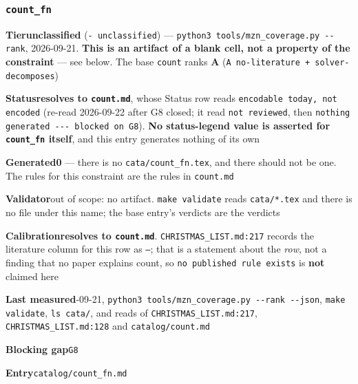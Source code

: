 \documentclass[10pt,a4paper]{article}
\newcommand{\entryfield}[2]{{\raggedright\textbf{#1}\quad #2\par}}
\begin{document}
\subsubsection*{\texttt{count\_\allowbreak{}fn}}
\label{entry:count-fn}
\entryfield{Tier}{\textbf{unclassified} (\texttt{- unclassified}) --- \texttt{python3 tools/\allowbreak{}mzn\_\allowbreak{}coverage.\allowbreak{}py -\allowbreak{}-\allowbreak{}rank}, 2026-09-21. \textbf{This is an artifact of a blank cell, not a property of the constraint} --- see below. The base \texttt{count} ranks \textbf{A} (\texttt{A no-\allowbreak{}literature + solver-\allowbreak{}decomposes})}
\entryfield{Status}{\textbf{resolves to \texttt{count.md}}, whose Status row reads \texttt{encodable today, not encoded} (re-read 2026-09-22 after G8 closed; it read \texttt{not reviewed}, then \texttt{nothing generated -\allowbreak{}-\allowbreak{}-\allowbreak{} blocked on G8}). \textbf{No status-legend value is asserted for \texttt{count\_fn} itself}, and this entry generates nothing of its own}
\entryfield{Generated}{\textbf{0} --- there is no \texttt{cata/count\_fn.tex}, and there should not be one. The rules for this constraint are the rules in \texttt{count.md}}
\entryfield{Validator}{out of scope: no artifact. \texttt{make validate} reads \texttt{cata/*.tex} and there is no file under this name; the base entry's verdicts are the verdicts}
\entryfield{Calibration}{\textbf{resolves to \texttt{count.md}}. \texttt{CHRISTMAS\_LIST.md:217} records the literature column for this row as \texttt{---}; that is a statement about the \emph{row}, not a finding that no paper explains count, so \texttt{no published rule exists} is \textbf{not} claimed here}
\entryfield{Last measured}{2026-09-21, \texttt{python3 tools/\allowbreak{}mzn\_\allowbreak{}coverage.\allowbreak{}py -\allowbreak{}-\allowbreak{}rank -\allowbreak{}-\allowbreak{}json}, \texttt{make validate}, \texttt{ls cata/}, and reads of \texttt{CHRISTMAS\_LIST.md:217}, \texttt{CHRISTMAS\_LIST.md:128} and \texttt{catalog/count.md}}
\entryfield{Blocking gap}{\texttt{G8}}
\entryfield{Entry}{\texttt{catalog/count\_fn.md}}
\end{document}
